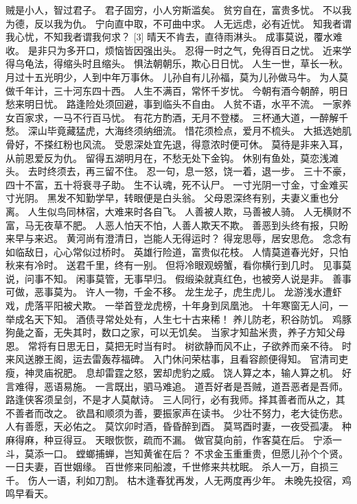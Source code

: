 \documentclass[12pt,UTF8]{ctexbook}
\begin{document}
贼是小人，智过君子。
君子固穷，小人穷斯滥矣。
贫穷自在，富贵多忧。
不以我为德，反以我为仇。
宁向直中取，不可曲中求。
人无远虑，必有近忧。
知我者谓我心忧，不知我者谓我何求？ [3]
晴天不肯去，直待雨淋头。
成事莫说，覆水难收。
是非只为多开口，烦恼皆因强出头。
忍得一时之气，免得百日之忧。
近来学得乌龟法，得缩头时且缩头。
惧法朝朝乐，欺心日日忧。
人生一世，草长一秋。
月过十五光明少，人到中年万事休。
儿孙自有儿孙福，莫为儿孙做马牛。
为人莫做千年计，三十河东四十西。
人生不满百，常怀千岁忧。
今朝有酒今朝醉，明日愁来明日忧。
路逢险处须回避，事到临头不自由。
人贫不语，水平不流。
一家养女百家求，一马不行百马忧。
有花方酌酒，无月不登楼。
三杯通大道，一醉解千愁。
深山毕竟藏猛虎，大海终须纳细流。
惜花须检点，爱月不梳头。
大抵选她肌骨好，不搽红粉也风流。
受恩深处宜先退，得意浓时便可休。
莫待是非来入耳，从前恩爱反为仇。
留得五湖明月在，不愁无处下金钩。
休别有鱼处，莫恋浅滩头。
去时终须去，再三留不住。
忍一句，息一怒，饶一着，退一步。
三十不豪，四十不富，五十将衰寻子助。
生不认魂，死不认尸。
一寸光阴一寸金，寸金难买寸光阴。
黑发不知勤学早，转眼便是白头翁。
父母恩深终有别，夫妻义重也分离。
人生似鸟同林宿，大难来时各自飞。
人善被人欺，马善被人骑。
人无横财不富，马无夜草不肥。
人恶人怕天不怕，人善人欺天不欺。
善恶到头终有报，只盼来早与来迟。
黄河尚有澄清日，岂能人无得运时？
得宠思辱，居安思危。
念念有如临敌日，心心常似过桥时。
英雄行险道，富贵似花枝。
人情莫道春光好，只怕秋来有冷时。
送君千里，终有一别。
但将冷眼观螃蟹，看你横行到几时。
见事莫说，问事不知。
闲事莫管，无事早归。
假缎染就真红色，也被旁人说是非。
善事可做，恶事莫为。
许人一物，千金不移。
龙生龙子，虎生虎儿。
龙游浅水遭虾戏，虎落平阳被犬欺。
一举首登龙虎榜，十年身到凤凰池。
十年寒窗无人问，一举成名天下知。
酒债寻常处处有，人生七十古来稀！
养儿防老，积谷防饥。
鸡豚狗彘之畜，无失其时，数口之家，可以无饥矣。
当家才知盐米贵，养子方知父母恩。
常将有日思无日，莫把无时当有时。
树欲静而风不止，子欲养而亲不待。
时来风送滕王阁，运去雷轰荐福碑。
入门休问荣枯事，且看容颜便得知。
官清司吏瘦，神灵庙祝肥。
息却雷霆之怒，罢却虎豹之威。
饶人算之本，输人算之机。
好言难得，恶语易施。
一言既出，驷马难追。
道吾好者是吾贼，道吾恶者是吾师。
路逢侠客须呈剑，不是才人莫献诗。
三人同行，必有我师。择其善者而从之，其不善者而改之。
欲昌和顺须为善，要振家声在读书。
少壮不努力，老大徒伤悲。
人有善愿，天必佑之。
莫饮卯时酒，昏昏醉到酉。
莫骂酉时妻，一夜受孤凄。
种麻得麻，种豆得豆。
天眼恢恢，疏而不漏。
做官莫向前，作客莫在后。
宁添一斗，莫添一口。
螳螂捕蝉，岂知黄雀在后？
不求金玉重重贵，但愿儿孙个个贤。
一日夫妻，百世姻缘。
百世修来同船渡，千世修来共枕眠。
杀人一万，自损三千。
伤人一语，利如刀割。
枯木逢春犹再发，人无两度再少年。
未晚先投宿，鸡鸣早看天。
\end{document}
